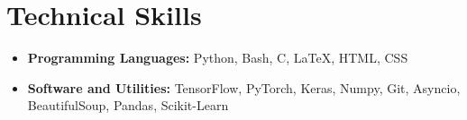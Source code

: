 \section*{Technical Skills}
\begin{itemize}[itemsep=0mm]

\item \textbf{Programming Languages:} Python, Bash, C, \LaTeX, HTML, CSS
\item \textbf{Software and Utilities:} TensorFlow, PyTorch, Keras, Numpy, Git, Asyncio, BeautifulSoup, Pandas, Scikit-Learn

\end{itemize}

